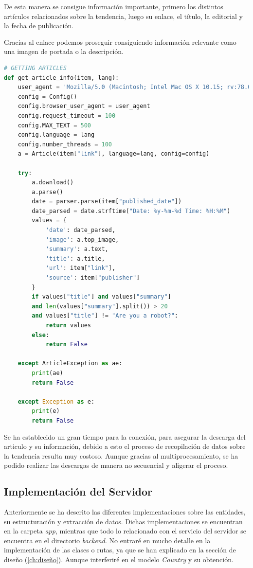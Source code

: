 De esta manera se consigue información importante, primero los distintos artículos relacionados sobre la tendencia, luego su enlace, el título, la editorial y la fecha de publicación.

\vspace{0.3cm}

Gracias al enlace podemos proseguir consiguiendo información relevante como una imagen de portada o la descripción.

\vspace{0.3cm}

\begin{lstlisting}[caption=Extracción de la información de las noticias,language=Python, mathescape=true]
# GETTING ARTICLES
def get_article_info(item, lang):
    user_agent = 'Mozilla/5.0 (Macintosh; Intel Mac OS X 10.15; rv:78.0) Gecko/20100101 Firefox/78.0'
    config = Config()
    config.browser_user_agent = user_agent
    config.request_timeout = 100
    config.MAX_TEXT = 500
    config.language = lang
    config.number_threads = 100
    a = Article(item["link"], language=lang, config=config)

    try:
        a.download()
        a.parse()
        date = parser.parse(item["published_date"])
        date_parsed = date.strftime("Date: %y-%m-%d Time: %H:%M")
        values = {
            'date': date_parsed,
            'image': a.top_image,
            'summary': a.text,
            'title': a.title,
            'url': item["link"],
            'source': item["publisher"]
        }
        if values["title"] and values["summary"] 
        and len(values["summary"].split()) > 20 
        and values["title"] != "Are you a robot?":
            return values
        else:
            return False

    except ArticleException as ae:
        print(ae)
        return False

    except Exception as e:
        print(e)
        return False
\end{lstlisting}

Se ha establecido un gran tiempo para la conexión, para asegurar la descarga del articulo y su información, debido a esto el proceso de recopilación de datos sobre la tendencia resulta muy costoso. Aunque gracias al multiprocesamiento, se ha podido realizar las descargas de manera no secuencial y aligerar el proceso.

\subsection{Implementación del Servidor}
Anteriormente se ha descrito las diferentes implementaciones sobre las entidades, su estructuración y extracción de datos. Dichas implementaciones se encuentran en la carpeta \textit{app}, mientras que todo lo relacionado con el servicio del servidor se encuentra en el directorio \textit{backend}. No entraré en mucho detalle en la implementación de las clases o rutas, ya que se han explicado en la sección de diseño (\ref{ch:diseño}). Aunque interferiré en el modelo \textit{Country} y su obtención.

